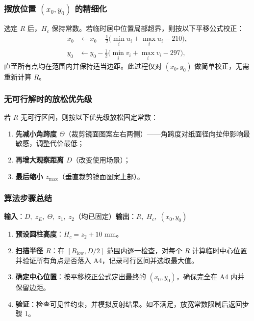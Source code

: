 \documentclass[12pt, a4paper]{ctexart}
\begin{document}
\subsubsection{摆放位置 \texorpdfstring{$(x_0,y_0)$}{(x0,y0)} 的精细化}

选定 $R$ 后，$H_c$ 保持常数。若临时居中位置局部超界，则按以下平移公式校正：
\[
\begin{aligned}
x_0&\leftarrow x_0-\tfrac{1}{2}\bigl(\min_i u_i+\max_i u_i-210\bigr),\\
y_0&\leftarrow y_0-\tfrac{1}{2}\bigl(\min_i v_i+\max_i v_i-297\bigr),
\end{aligned}
\]
直至所有点均在范围内并保持适当边距。此过程仅对 $(x_0,y_0)$ 做简单校正，无需重新计算 $R$。

\subsubsection{无可行解时的放松优先级}

若 $R$ 无可行区间，则按以下优先级放松固定常数：
\begin{enumerate}
    \item \textbf{先减小角跨度 $\Theta$}（裁剪镜面图案左右两侧）——角跨度对纸面径向拉伸影响最敏感，调整代价最低；
    \item \textbf{再增大观察距离 $D$}（改变使用场景）；
    \item \textbf{最后缩小 $z_{\max}$}（垂直裁剪镜面图案上部）。
\end{enumerate}

\subsubsection{算法步骤总结}

\textbf{输入}：$D,\;z_E,\;\Theta,\;z_1,\;z_2$（均已固定）\quad\textbf{输出}：$R,\;H_c,\;(x_0,y_0)$
\begin{enumerate}
    \item \textbf{预设圆柱高度}：$H_c=z_2+10$ mm。
    \item \textbf{扫描半径 $R$}：在 $[R_{\mathrm{low}},D/2]$ 范围内逐一检查，对每个 $R$ 计算临时中心位置并验证所有角点是否落入 A4，记录可行区间并选取最大值。
    \item \textbf{确定中心位置}：按平移校正公式定出最终的 $(x_0,y_0)$，确保完全在 A4 内并保留边距。
    \item \textbf{验证}：检查可见性约束，并模拟反射结果。如不满足，放宽常数限制后返回步骤 1。
\end{enumerate}
\end{document}
